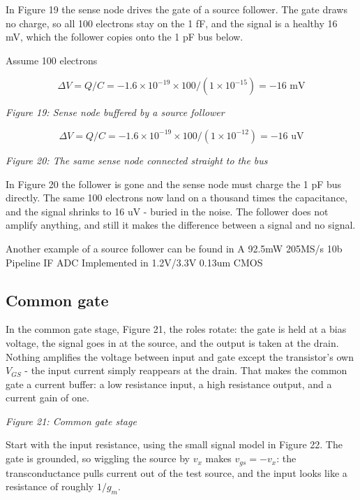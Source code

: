 In Figure 19 the sense node drives the gate of a source follower. The
gate draws no charge, so all 100 electrons stay on the 1 fF, and the
signal is a healthy 16 mV, which the follower copies onto the 1 pF bus
below.

Assume 100 electrons

\[ \Delta V  = Q/C  = -1.6 \times 10^{-19} \times 100 / (1\times 10^{-15}) = - 16\text{ mV} \]


{
\centering
{}
}

\emph{Figure 19: Sense node buffered by a source follower}

\[ \Delta V  = Q/C  = -1.6 \times 10^{-19} \times 100 / (1\times 10^{-12}) = - 16\text{ uV} \]


{
\centering
{}
}

\emph{Figure 20: The same sense node connected straight to the bus}

In Figure 20 the follower is gone and the sense node must charge the 1
pF bus directly. The same 100 electrons now land on a thousand times the
capacitance, and the signal shrinks to 16 uV - buried in the noise. The
follower does not amplify anything, and still it makes the difference
between a signal and no signal.

Another example of a source follower can be found in A 92.5mW 205MS/s
10b Pipeline IF ADC Implemented in 1.2V/3.3V 0.13um CMOS

\subsection{Common gate}\label{common-gate}

In the common gate stage, Figure 21, the roles rotate: the gate is held
at a bias voltage, the signal goes in at the source, and the output is
taken at the drain. Nothing amplifies the voltage between input and gate
except the transistor's own \(V_{GS}\) - the input current simply
reappears at the drain. That makes the common gate a current buffer: a
low resistance input, a high resistance output, and a current gain of
one.


{
\centering
{}
}

\emph{Figure 21: Common gate stage}

Start with the input resistance, using the small signal model in Figure
22. The gate is grounded, so wiggling the source by \(v_x\) makes
\(v_{gs} = -v_x\): the transconductance pulls current out of the test
source, and the input looks like a resistance of roughly \(1/g_m\).


